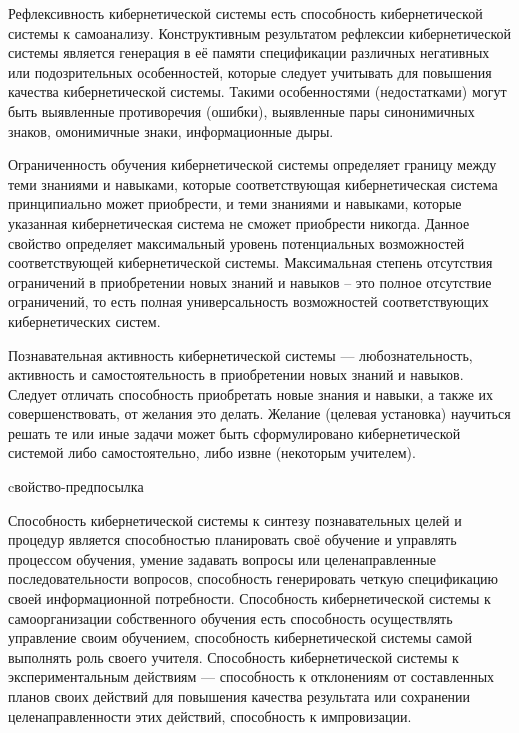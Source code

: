 Рефлексивность кибернетической системы есть способность кибернетической системы к самоанализу.
Конструктивным результатом рефлексии кибернетической системы является генерация в её памяти спецификации различных негативных или подозрительных особенностей, которые следует учитывать для повышения качества кибернетической системы.
Такими особенностями (недостатками) могут быть выявленные противоречия (ошибки), выявленные пары синонимичных знаков, омонимичные знаки, информационные дыры.

Ограниченность обучения кибернетической системы определяет границу между теми знаниями и навыками, которые соответствующая кибернетическая система принципиально может приобрести, и теми знаниями и навыками, которые указанная кибернетическая система не сможет приобрести никогда.
Данное свойство определяет максимальный уровень потенциальных возможностей соответствующей кибернетической системы.
Максимальная степень отсутствия ограничений в приобретении новых знаний и навыков – это полное отсутствие ограничений, то есть полная универсальность возможностей соответствующих кибернетических систем.

Познавательная активность кибернетической системы --- любознательность, активность и самостоятельность в приобретении новых знаний и навыков.
Следует отличать способность приобретать новые знания и навыки, а также их совершенствовать, от желания это делать.
Желание (целевая установка) научиться решать те или иные задачи может быть сформулировано кибернетической системой либо самостоятельно, либо извне (некоторым учителем).

\begin{SCn}
\begin{scnrelfromlist}{cвойство-предпосылка}
\end{scnrelfromlist}
\end{SCn}

Способность кибернетической системы к синтезу познавательных целей и процедур является способностью планировать своё обучение и управлять процессом обучения, умение задавать вопросы или целенаправленные последовательности вопросов, способность генерировать четкую спецификацию своей информационной потребности.
Способность кибернетической системы к самоорганизации собственного обучения есть способность осуществлять управление своим обучением, способность кибернетической системы самой выполнять роль своего учителя.
Способность кибернетической системы к экспериментальным действиям --- способность к отклонениям от составленных планов своих действий для повышения качества результата или сохранении целенаправленности этих действий, способность к импровизации.

